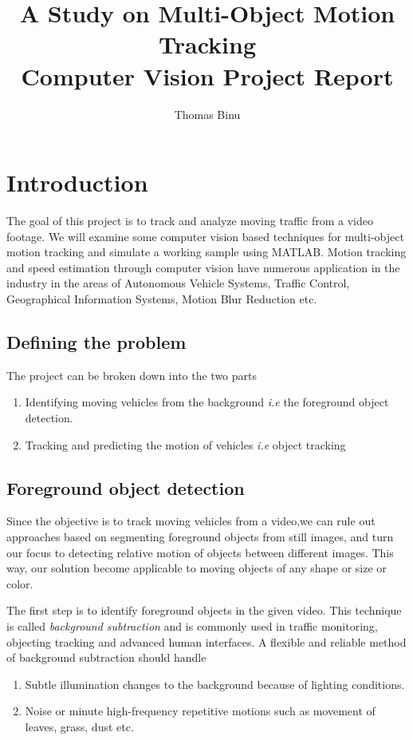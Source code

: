 \documentclass{article}
\author{Thomas Binu}
\title{\textbf{A Study on Multi-Object Motion Tracking\\Computer Vision Project Report}}
\newcommand{\ie}{ \textit{i.e} }
\begin{document}
	\maketitle
	\section{Introduction}
	The goal of this project is to track and analyze moving traffic from a video footage. We will examine some computer vision based techniques for multi-object motion tracking and simulate a working sample using MATLAB. Motion tracking and speed estimation through computer vision have numerous application in the industry in the areas of Autonomous Vehicle Systems, Traffic Control, Geographical Information Systems, Motion Blur Reduction etc.
	
	\subsection{Defining the problem}
	The project can be broken down into the two parts
	\begin{enumerate}
		\item Identifying moving vehicles from the background \ie the foreground object detection.
		\item Tracking and predicting the motion of vehicles \ie object tracking	
	\end{enumerate}
	
	\subsection{Foreground object detection}
	Since the objective is to track moving vehicles from a video,we can rule out approaches based on segmenting foreground objects from still images, and turn our focus to detecting relative motion of objects between different images. This way, our solution become applicable to moving objects of any shape or size or color.
	
	The first step is to identify foreground objects in the given video. This technique is called \textit{background subtraction} and is commonly used in traffic monitoring, objecting tracking and advanced human interfaces. A flexible and reliable method of background subtraction should handle 
	
		\begin{enumerate}
		\item Subtle illumination changes to the background because of lighting conditions.
		\item Noise or minute high-frequency repetitive motions such as movement of leaves, grass, dust etc.
		\end{enumerate}
	
\end{document}
